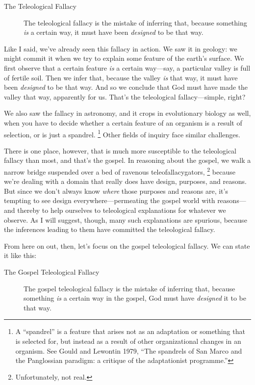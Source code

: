 		\begin{description}
			\item[The Teleological Fallacy] The teleological fallacy is the mistake of inferring that, because something \textit{is} a certain way, it must have been \textit{designed} to be that way.
		\end{description}
		
		Like I said, we've already seen this fallacy in action. We saw it in geology: we might commit it when we try to explain some feature of the earth's surface. We first observe that a certain feature \textit{is} a certain way---say, a particular valley is full of fertile soil. Then we infer that, because the valley \textit{is} that way, it must have been \textit{designed} to be that way. And so we conclude that God must have made the valley that way, apparently for us. That's the teleological fallacy---simple, right?
		
		We also saw the fallacy in astronomy, and it crops in evolutionary biology as well, when you have to decide whether a certain feature of an organism is a result of selection, or is just a spandrel.%
			\footnote{A ``spandrel'' is a feature that arises not as an adaptation or something that is selected for, but instead as a result of other organizational changes in an organism. See Gould and Lewontin 1979, ``The spandrels of San Marco and the Panglossian paradigm: a critique of the adaptationist programme.''}
		Other fields of inquiry face similar challenges.
		
		There is one place, however, that is much more susceptible to the teleological fallacy than most, and that's the gospel. In reasoning about the gospel, we walk a narrow bridge suspended over a bed of ravenous teleofallacygators,%
			\footnote{Unfortunately, not real.}
		because we're dealing with a domain that really does have design, purposes, and reasons. But since we don't always know \textit{where} those purposes and reasons are, it's tempting to see design everywhere---permeating the gospel world with reasons---and thereby to help ourselves to teleological explanations for whatever we observe. As I will suggest, though, many such explanations are spurious, because the inferences leading to them have committed the teleological fallacy.
		
		From here on out, then, let's focus on the gospel teleological fallacy. We can state it like this:
		
			\begin{description}
				\item[The Gospel Teleological Fallacy] The gospel teleological fallacy is the mistake of inferring that, because something \textit{is} a certain way in the gospel, God must have \textit{designed} it to be that way. 
			\end{description}
			
